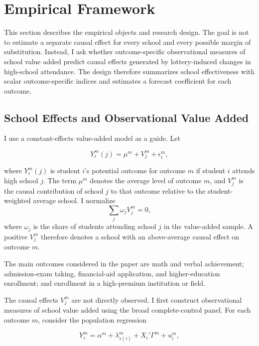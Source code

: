 \documentclass[a4paper, article, english, oneside, unknownkeysallowed, 12pt]{memoir}
\begin{document}
\clearpage

\section{Empirical Framework}
\label{sec:framework}

This section describes the empirical objects and research design. The goal is not to
estimate a separate causal effect for every school and every possible margin of
substitution. Instead, I ask whether outcome-specific observational measures of school
value added predict causal effects generated by lottery-induced changes in high-school
attendance. The design therefore summarizes school effectiveness with scalar
outcome-specific indices and estimates a forecast coefficient for each outcome.


\subsection{School Effects and Observational Value Added}

I use a constant-effects value-added model as a guide. Let

\begin{equation}
    Y_i^m(j)
    =
    \mu^m + V_j^m + \epsilon_i^m,
    \label{eq:potential-va}
\end{equation}

where $Y_i^m(j)$ is student $i$'s potential outcome for outcome $m$ if student $i$
attends high school $j$. The term $\mu^m$ denotes the average level of outcome $m$,
and $V_j^m$ is the causal contribution of school $j$ to that outcome relative to the
student-weighted average school. I normalize
\[
    \sum_j \omega_j V_j^m = 0,
\]
where $\omega_j$ is the share of students attending school $j$ in the value-added
sample. A positive $V_j^m$ therefore denotes a school with an above-average causal
effect on outcome $m$.

The main outcomes considered in the paper are math and verbal achievement;
admission-exam taking, financial-aid application, and higher-education enrollment;
and enrollment in a high-premium institution or field.

The causal effects $V_j^m$ are not directly observed. I first construct observational
measures of school value added using the broad complete-control panel. For each
outcome $m$, consider the population regression

\begin{equation}
    Y_i^m
    =
    \alpha^m
    +
    \lambda_{s(i)}^m
    +
    X_i'\Gamma^m
    +
    u_i^m,
    \label{eq:observational-va}
\end{equation}
\end{document}
